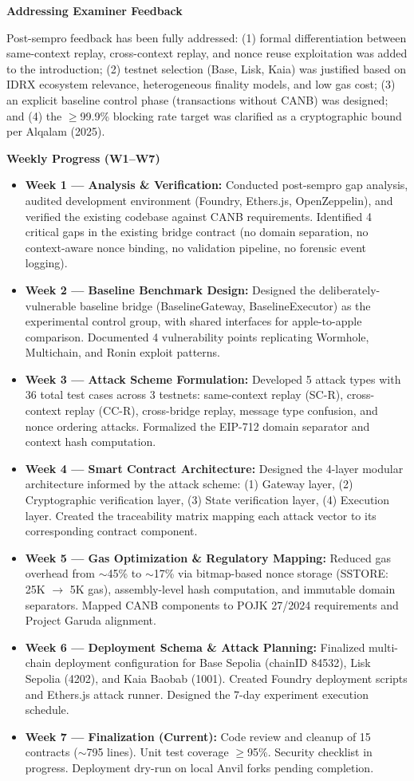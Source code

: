 \documentclass[
]{article}
\begin{document}
\textbf{Addressing Examiner Feedback}

Post-sempro feedback has been fully addressed: (1) formal differentiation between same-context replay, cross-context replay, and nonce reuse exploitation was added to the introduction; (2) testnet selection (Base, Lisk, Kaia) was justified based on IDRX ecosystem relevance, heterogeneous finality models, and low gas cost; (3) an explicit baseline control phase (transactions without CANB) was designed; and (4) the $\geq$99.9\% blocking rate target was clarified as a cryptographic bound per Alqalam (2025).

\textbf{Weekly Progress (W1--W7)}

\begin{itemize}
  \item \textbf{Week 1 --- Analysis \& Verification:} Conducted post-sempro gap analysis, audited development environment (Foundry, Ethers.js, OpenZeppelin), and verified the existing codebase against CANB requirements. Identified 4 critical gaps in the existing bridge contract (no domain separation, no context-aware nonce binding, no validation pipeline, no forensic event logging).
  \item \textbf{Week 2 --- Baseline Benchmark Design:} Designed the deliberately-vulnerable baseline bridge (BaselineGateway, BaselineExecutor) as the experimental control group, with shared interfaces for apple-to-apple comparison. Documented 4 vulnerability points replicating Wormhole, Multichain, and Ronin exploit patterns.
  \item \textbf{Week 3 --- Attack Scheme Formulation:} Developed 5 attack types with 36 total test cases across 3 testnets: same-context replay (SC-R), cross-context replay (CC-R), cross-bridge replay, message type confusion, and nonce ordering attacks. Formalized the EIP-712 domain separator and context hash computation.
  \item \textbf{Week 4 --- Smart Contract Architecture:} Designed the 4-layer modular architecture informed by the attack scheme: (1) Gateway layer, (2) Cryptographic verification layer, (3) State verification layer, (4) Execution layer. Created the traceability matrix mapping each attack vector to its corresponding contract component.
  \item \textbf{Week 5 --- Gas Optimization \& Regulatory Mapping:} Reduced gas overhead from $\sim$45\% to $\sim$17\% via bitmap-based nonce storage (SSTORE: 25K $\rightarrow$ 5K gas), assembly-level hash computation, and immutable domain separators. Mapped CANB components to POJK 27/2024 requirements and Project Garuda alignment.
  \item \textbf{Week 6 --- Deployment Schema \& Attack Planning:} Finalized multi-chain deployment configuration for Base Sepolia (chainID 84532), Lisk Sepolia (4202), and Kaia Baobab (1001). Created Foundry deployment scripts and Ethers.js attack runner. Designed the 7-day experiment execution schedule.
  \item \textbf{Week 7 --- Finalization (Current):} Code review and cleanup of 15 contracts ($\sim$795 lines). Unit test coverage $\geq$95\%. Security checklist in progress. Deployment dry-run on local Anvil forks pending completion.
\end{itemize}
\end{document}
